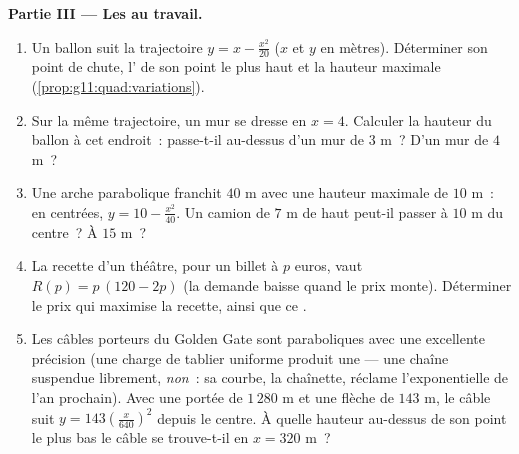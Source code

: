 \begin{problem}
\medskip
\noindent\textbf{Partie III --- Les  au travail.}
\begin{enumerate}[resume]
  \item Un ballon suit la trajectoire $y = x - \frac{x^2}{20}$ ($x$
        et $y$ en mètres). Déterminer son point de chute, l'
        de son point le plus haut et la hauteur maximale
        (\cref{prop:g11:quad:variations}).
  \item Sur la même trajectoire, un mur se dresse en $x = 4$.
        Calculer la hauteur du ballon à cet endroit~: passe-t-il
        au-dessus d'un mur de $3$ m~? D'un mur de $4$ m~?
  \item Une arche parabolique franchit $40$ m avec une hauteur
        maximale de $10$ m~: en  centrées,
        $y = 10 - \frac{x^2}{40}$. Un camion de $7$ m de haut
        peut-il passer à $10$ m du centre~? À $15$ m~?
  \item La recette d'un théâtre, pour un billet à $p$ euros, vaut
        $R(p) = p\,(120 - 2p)$ (la demande baisse quand le prix
        monte). Déterminer le prix qui maximise la recette, ainsi
        que ce .
  \item Les câbles porteurs du Golden Gate sont paraboliques avec
        une excellente précision (une charge de tablier uniforme
        produit une  --- une chaîne suspendue librement,
        \emph{non}~: sa courbe, la chaînette, réclame
        l'exponentielle de l'an prochain). Avec une portée de
        $1\,280$ m et une flèche de $143$ m, le câble suit
        $y = 143\left(\frac{x}{640}\right)^2$ depuis le centre. À
        quelle hauteur au-dessus de son point le plus bas le câble
        se trouve-t-il en $x = 320$ m~?
\end{enumerate}


\end{problem}
